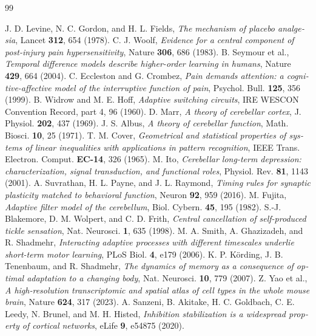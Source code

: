 \begin{thebibliography}{99}
\begin{otherlanguage}{english}
 J. D. Levine, N. C. Gordon, and H. L. Fields, \emph{The mechanism of placebo analgesia}, Lancet \textbf{312}, 654 (1978).
 C. J. Woolf, \emph{Evidence for a central component of post-injury pain hypersensitivity}, Nature \textbf{306}, 686 (1983).
 B. Seymour et al., \emph{Temporal difference models describe higher-order learning in humans}, Nature \textbf{429}, 664 (2004).
 C. Eccleston and G. Crombez, \emph{Pain demands attention: a cognitive-affective model of the interruptive function of pain}, Psychol. Bull. \textbf{125}, 356 (1999).
 B. Widrow and M. E. Hoff, \emph{Adaptive switching circuits}, IRE WESCON Convention Record, part 4, 96 (1960).
 D. Marr, \emph{A theory of cerebellar cortex}, J. Physiol. \textbf{202}, 437 (1969).
 J. S. Albus, \emph{A theory of cerebellar function}, Math. Biosci. \textbf{10}, 25 (1971).
 T. M. Cover, \emph{Geometrical and statistical properties of systems of linear inequalities with applications in pattern recognition}, IEEE Trans. Electron. Comput. \textbf{EC-14}, 326 (1965).
 M. Ito, \emph{Cerebellar long-term depression: characterization, signal transduction, and functional roles}, Physiol. Rev. \textbf{81}, 1143 (2001).
 A. Suvrathan, H. L. Payne, and J. L. Raymond, \emph{Timing rules for synaptic plasticity matched to behavioral function}, Neuron \textbf{92}, 959 (2016).
 M. Fujita, \emph{Adaptive filter model of the cerebellum}, Biol. Cybern. \textbf{45}, 195 (1982).
 S.-J. Blakemore, D. M. Wolpert, and C. D. Frith, \emph{Central cancellation of self-produced tickle sensation}, Nat. Neurosci. \textbf{1}, 635 (1998).
 M. A. Smith, A. Ghazizadeh, and R. Shadmehr, \emph{Interacting adaptive processes with different timescales underlie short-term motor learning}, PLoS Biol. \textbf{4}, e179 (2006).
 K. P. K\"ording, J. B. Tenenbaum, and R. Shadmehr, \emph{The dynamics of memory as a consequence of optimal adaptation to a changing body}, Nat. Neurosci. \textbf{10}, 779 (2007).
 Z. Yao et al., \emph{A high-resolution transcriptomic and spatial atlas of cell types in the whole mouse brain}, Nature \textbf{624}, 317 (2023).
 A. Sanzeni, B. Akitake, H. C. Goldbach, C. E. Leedy, N. Brunel, and M. H. Histed, \emph{Inhibition stabilization is a widespread property of cortical networks}, eLife \textbf{9}, e54875 (2020).

\end{otherlanguage}
\end{thebibliography}

